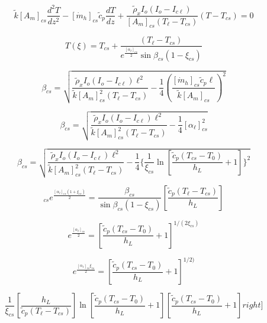 \begin{equation}%
\tilde{k}[A_m]_{cs}\frac{d^2T}{dz^2}-[\dot{m}_h]_{cs}\tilde{c}_p\frac{dT}{dz}+\frac{\tilde{\rho}_xI_o(I_o-I_{c\ell})}{[A_m]_{cs}(T_\ell-T_{cs})}(T-T_{cs})=0
\end{equation}

\begin{equation}%
T(\xi)=T_{cs}+\frac{(T_\ell-T_{cs})}{e^{\frac{[\alpha_\ell]_{cs}}{2}}\sin\beta_{cs}(1-\xi_{cs})}
\end{equation}

\begin{equation}%
\beta_{cs}=\sqrt{\frac{\tilde{\rho}_xI_o(I_o-I_{c\ell})\ell^2}{\tilde{k}[A_m]_{cs}^{2}(T_\ell-T_{cs})}-\frac{1}{4}(\frac{[\dot{m}_h]_{cs}\tilde{c}_p\ell}{\tilde{k}[A_m]_{cs}})^2}
\end{equation}

\begin{equation}%
\beta_{cs}=\sqrt{\frac{\tilde{\rho}_xI_o(I_o-I_{c\ell})\ell^2}{\tilde{k}[A_m]_{cs}^{2}(T_\ell-T_{cs})}-\frac{1}{4}[\alpha_\ell]_{cs}^{2}}
\end{equation}

\begin{equation}%
\beta_{cs}=\sqrt{\frac{\tilde{\rho}_xI_o(I_o-I_{c\ell})\ell^2}{\tilde{k}[A_m]_{cs}^{2}(T_\ell-T_{cs})}-\frac{1}{4}\{\frac{1}{\xi_{cs}}\ln\left[\frac{\tilde{c}_p(T_{cs}-T_0)}{h_L}+1\right]\}^2}
\end{equation}

\begin{equation}%
[\alpha_\ell]_{cs}e^{\frac{[\alpha_\ell]_{cs}(1+\xi_{cs})}{2}}=\frac{\beta_{cs}}{\sin\beta_{cs}(1-\xi_{cs})}\left[\frac{\tilde{c}_p(T_\ell-T_{cs})}{h_L}\right]
\end{equation}

\begin{equation}%
e^{\frac{[\alpha_\ell]_{cs}}{2}}=\left[\frac{\tilde{c}_p(T_{cs}-T_0)}{h_L}+1\right]^{1/(2\xi_{cs})}
\end{equation}

\begin{equation}%
e^{\frac{[\alpha_\ell]_{cs}\xi_{cs}}{2}}=\left[\frac{\tilde{c}_p(T_{cs}-T_0)}{h_L}+1\right]^{1/2)}
\end{equation}

\begin{equation}%
\frac{1}{\xi_{cs}}\left[\frac{h_L}{\tilde{c}_p(T_\ell-T_{cs})}\right]\ln\left[\frac{\tilde{c}_p(T_{cs}-T_0)}{h_L}+1\right]\left[\frac{\tilde{c}_p(T_{cs}-T_0)}{h_L}+1\right]right]
\end{equation}



